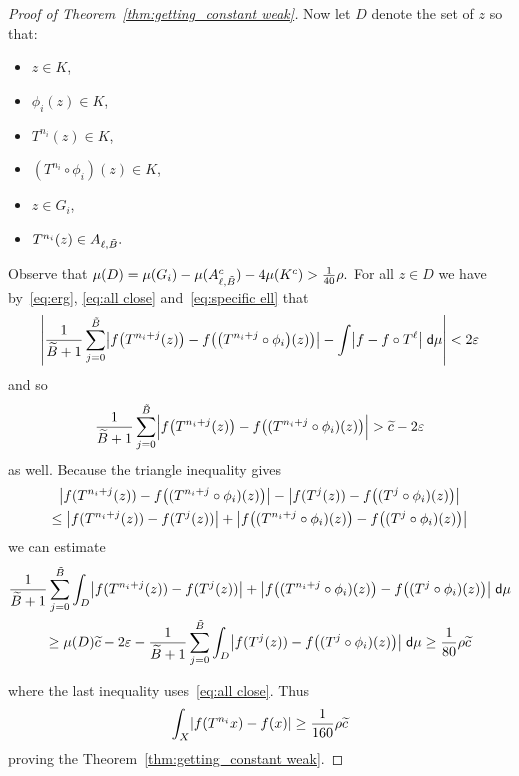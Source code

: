 \documentclass[10pt]{amsart}
\theoremstyle{definition}\newtheorem{defi}[theo]{Definition}\newtheorem{rema}[theo]{Remark}\newtheorem{exam}[theo]{Example}\newtheorem{exem}[theo]{Example}\newtheorem{nota}[theo]{Notation}
\newcommand{\intd}{\;\mathsf{d}}
\let\originalleft\left
\let\originalright\right
\renewcommand{\left}{\mathopen{}\mathclose\bgroup\originalleft}
\renewcommand{\right}{\aftergroup\egroup\originalright}
\let\oldtilde\tilde
\renewcommand*{\tilde}[1]{\mathchoice{\widetilde{#1}}{\widetilde{#1}}{\oldtilde{#1}}{\oldtilde{#1}}}
\begin{document}
\begin{proof}[Proof of Theorem~\ref{thm:getting_constant weak}]
Now let $D$ denote the set of $z$ so that:
\begin{itemize}
\item $z \in K$,
\item $\phi_i(z) \in K$,
\item $T^{n_i}(z) \in K$,
\item $(T^{n_i} \circ \phi_i)(z)\in K$,
\item $z \in G_i$,
\item $T^{n_i}(z) \in A_{\ell,\tilde{B}}.$
\end{itemize}
Observe that $\mu(D)=\mu(G_i)-\mu(A_{\ell,\tilde{B}}^c)-4 \mu(K^c)>\frac 1 {40}\rho.$ For all $z\in D$ we have by~\eqref{eq:erg}, \eqref{eq:all close} and~\eqref{eq:specific ell} that
\[
\left| \frac{1}{\tilde{B}+1} \sum_{j=0}^{\tilde{B}} \left|f\left(T^{n_i+j}(z)\right)-f\left(\left(T^{n_i+j} \circ \phi_i\right)(z)\right)\right| - \int \left|f-f \circ T^\ell\right| \intd\mu\right| < 2\varepsilon
\]
and so
\[
\frac{1}{\tilde{B}+1} \sum_{j=0}^{\tilde{B}} \Bigl| f\left(T^{n_i+j}(z)\right)-f\left((T^{n_i+j} \circ \phi_i)(z)\right) \Bigr| > \tilde{c} - 2\varepsilon
\]
as well. Because the triangle inequality gives
\begin{multline*}
\left|f(T^{n_i+j}(z))-f\left((T^{n_i+j} \circ \phi_i)(z)\right)\right|-
\left|f(T^j(z))-f\left((T^j \circ \phi_i)(z)\right)\right|\\
\leq 
\left|f(T^{n_i+j}(z))-f(T^j(z))\right|+\left|f\left((T^{n_i+j} \circ \phi_i)(z)\right)-f\left((T^j\circ \phi_i)(z)\right)\right|
\end{multline*}
we can estimate
\begin{multline*}
\frac{1}{\tilde{B}+1} \sum_{j=0}^{\tilde{B}}\int_{D} \left| f(T^{n_i+j}(z))-f(T^j(z)) \right| + \left| f\left((T^{n_i+j} \circ \phi_i)(z)\right)-f\left((T^j \circ \phi_i)(z)\right) \right| \intd\mu
\\
\ge\mu(D) \tilde{c} - 2\varepsilon - \frac{1}{\tilde{B}+1} \sum_{j=0}^{\tilde{B}}\int_{D} \left|f(T^j(z))-f\left((T^j \circ \phi_i)(z)\right)\right| \intd \mu\geq \frac{1}{80} \rho \tilde{c}
\end{multline*}

\pagebreak{}
\noindent
where the last inequality uses~\eqref{eq:all close}. Thus
\begin{equation}\label{eq:not rigid}
\int_X \left|f(T^{n_i}x)-f(x)\right|\geq \frac 1 {160} \rho \tilde{c}
\end{equation}
proving the Theorem~\ref{thm:getting_constant weak}.
\end{proof}
\end{document}
